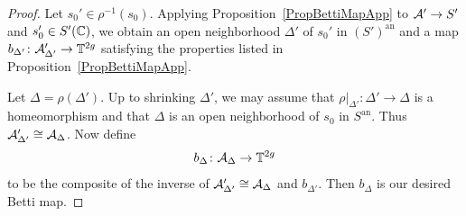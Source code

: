 \begin{proof}
Let $s_0' \in \rho^{-1}(s_0)$. Applying Proposition~\ref{PropBettiMapApp} to $\mathcal{A}' \rightarrow S'$ and $s_0' \in S'({\mathbb{C}})$, we obtain an open neighborhood $\Delta'$ of $s_0'$ in $(S')^{\mathrm{an}}$ and a map $b_{\Delta'} \colon \mathcal{A}'_{\Delta'} \rightarrow \mathbb{T}^{2g}$ satisfying the properties listed in Proposition~\ref{PropBettiMapApp}.

Let $\Delta = \rho(\Delta')$. Up to shrinking $\Delta'$, we may assume that $\rho|_{\Delta'} \colon \Delta' \rightarrow \Delta$ is a homeomorphism and that $\Delta$ is an open neighborhood of $s_0$ in $S^{\mathrm{an}}$. Thus $\mathcal{A}'_{\Delta'} \cong \mathcal{A}_{\Delta}$. Now define
\[
b_{\Delta} \colon \mathcal{A}_{\Delta} \rightarrow \mathbb{T}^{2g}
\]
to be the composite of the inverse of $\mathcal{A}'_{\Delta'} \cong \mathcal{A}_{\Delta}$ and $b_{\Delta'}$. Then $b_{\Delta}$ is our desired Betti map.
\end{proof}

